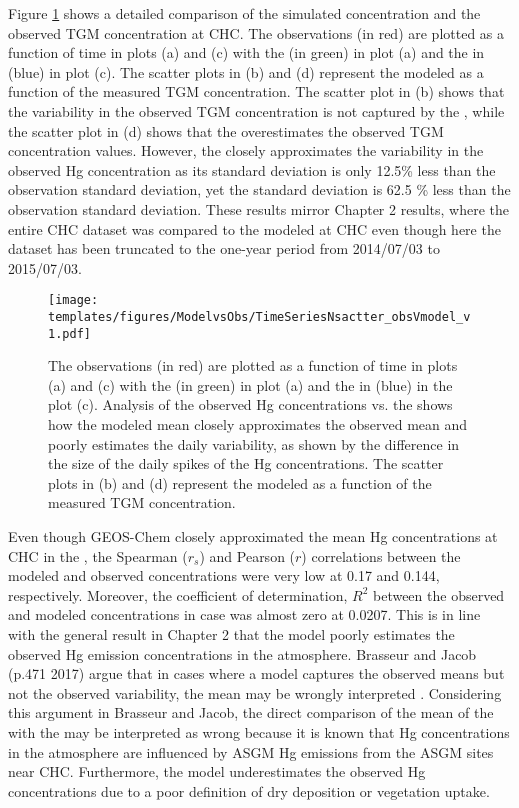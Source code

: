 \FloatBarrier
\begin{flushleft}
   Figure \ref{fig:ModelvsObsNstats} shows a detailed comparison of the simulated \hg concentration and the observed TGM concentration at CHC. The observations (in red) are plotted as a function of time in plots (a) and (c) with the \off (in green) in plot (a)  and the \on in (blue) in plot (c). The scatter plots in (b) and (d) represent the modeled \hg  as a function of the measured TGM concentration. The scatter plot in (b) shows that the variability in the observed TGM concentration is not captured by the \off, while the scatter plot in (d) shows that the \on overestimates the observed TGM concentration values. However, the \on closely approximates the variability in the observed Hg concentration as its standard deviation is only 12.5\% less than the observation standard deviation, yet the \off standard deviation is 62.5 \% less than the observation standard deviation. These results mirror Chapter 2 results, where the entire CHC dataset was compared to the modeled \hgc at CHC even though here the dataset has been truncated to the one-year period from 2014/07/03 to 2015/07/03. 
\end{flushleft}
\begin{figure}[H]
  \texttt{[image: templates/figures/ModelvsObs/TimeSeriesNsactter\_obsVmodel\_v1.pdf]}
  \centering
  \caption{The observations (in red) are plotted as a function of time in plots (a) and (c) with the \off (in green) in plot (a) and the \on in (blue) in the plot (c). Analysis of the observed Hg concentrations vs. the \off  shows how the modeled mean closely approximates the observed mean and poorly estimates the daily variability, as shown by the difference in the size of the daily spikes of the Hg concentrations. The scatter plots in (b) and (d) represent the modeled \hg  as a function of the measured TGM concentration.}
  \label{fig:ModelvsObsNstats}
\end{figure}
\FloatBarrier

\begin{flushleft}
    Even though GEOS-Chem closely approximated the mean Hg concentrations at CHC in the \off, the Spearman ($r_s$) and Pearson ($r$) correlations between the modeled and observed concentrations were very low at 0.17 and 0.144, respectively. Moreover, the coefficient of determination, $R^2$ between the observed and modeled concentrations in \off case was almost zero at 0.0207. This is in line with the general result in Chapter 2 that the model poorly estimates the observed Hg emission concentrations in the atmosphere. Brasseur and Jacob (p.471 2017) argue that in cases where a model captures the observed means but not the observed variability, the mean may be wrongly interpreted \cite{brasseur_modeling_2017}. Considering this argument in Brasseur and Jacob, the direct comparison of the mean of the \off with the \obsC may be interpreted as wrong because it is known that Hg concentrations in the atmosphere are influenced by ASGM Hg emissions from the ASGM sites near CHC. Furthermore, the model underestimates the observed Hg concentrations due to a poor definition of dry deposition or vegetation uptake.  
\end{flushleft}

